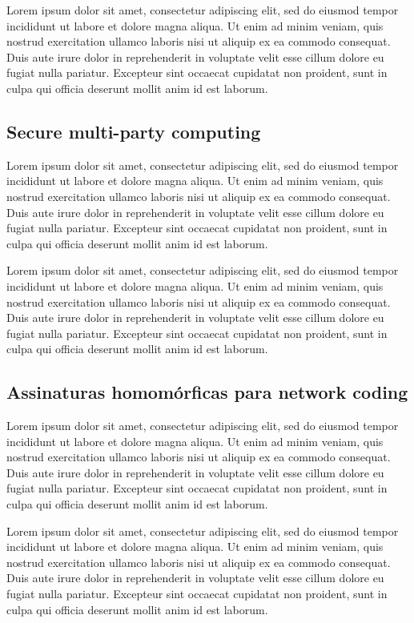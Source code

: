 	Lorem ipsum dolor sit amet, consectetur adipiscing elit, sed do eiusmod tempor incididunt ut labore et dolore magna aliqua. Ut enim ad minim veniam, quis nostrud exercitation ullamco laboris nisi ut aliquip ex ea commodo consequat. Duis aute irure dolor in reprehenderit in voluptate velit esse cillum dolore eu fugiat nulla pariatur. Excepteur sint occaecat cupidatat non proident, sunt in culpa qui officia deserunt mollit anim id est laborum.
	
	\subsection{Secure multi-party computing}
	Lorem ipsum dolor sit amet, consectetur adipiscing elit, sed do eiusmod tempor incididunt ut labore et dolore magna aliqua. Ut enim ad minim veniam, quis nostrud exercitation ullamco laboris nisi ut aliquip ex ea commodo consequat. Duis aute irure dolor in reprehenderit in voluptate velit esse cillum dolore eu fugiat nulla pariatur. Excepteur sint occaecat cupidatat non proident, sunt in culpa qui officia deserunt mollit anim id est laborum.
	
	Lorem ipsum dolor sit amet, consectetur adipiscing elit, sed do eiusmod tempor incididunt ut labore et dolore magna aliqua. Ut enim ad minim veniam, quis nostrud exercitation ullamco laboris nisi ut aliquip ex ea commodo consequat. Duis aute irure dolor in reprehenderit in voluptate velit esse cillum dolore eu fugiat nulla pariatur. Excepteur sint occaecat cupidatat non proident, sunt in culpa qui officia deserunt mollit anim id est laborum.
	
	\subsection{Assinaturas homomórficas para network coding}
	Lorem ipsum dolor sit amet, consectetur adipiscing elit, sed do eiusmod tempor incididunt ut labore et dolore magna aliqua. Ut enim ad minim veniam, quis nostrud exercitation ullamco laboris nisi ut aliquip ex ea commodo consequat. Duis aute irure dolor in reprehenderit in voluptate velit esse cillum dolore eu fugiat nulla pariatur. Excepteur sint occaecat cupidatat non proident, sunt in culpa qui officia deserunt mollit anim id est laborum.
	
	Lorem ipsum dolor sit amet, consectetur adipiscing elit, sed do eiusmod tempor incididunt ut labore et dolore magna aliqua. Ut enim ad minim veniam, quis nostrud exercitation ullamco laboris nisi ut aliquip ex ea commodo consequat. Duis aute irure dolor in reprehenderit in voluptate velit esse cillum dolore eu fugiat nulla pariatur. Excepteur sint occaecat cupidatat non proident, sunt in culpa qui officia deserunt mollit anim id est laborum.

